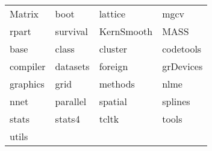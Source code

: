 \begin{tabular}{llll} 
Matrix & boot & lattice & mgcv\\ 
rpart & survival & KernSmooth & MASS\\ 
base & class & cluster & codetools\\ 
compiler & datasets & foreign & grDevices\\ 
graphics & grid & methods & nlme\\ 
nnet & parallel & spatial & splines\\ 
stats & stats4 & tcltk & tools\\ 
utils  &   &   \\ 
\end{tabular}
